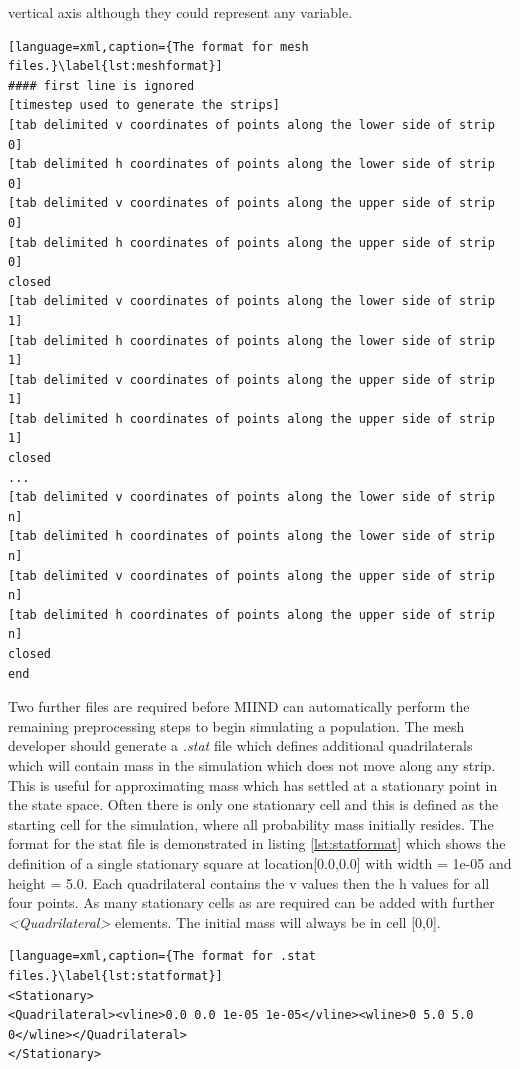 \documentclass[utf8]{frontiers_suppmat} %
\begin{document}
vertical axis although they could represent any variable.

\begin{lstlisting}[language=xml,caption={The format for mesh files.}\label{lst:meshformat}]
#### first line is ignored
[timestep used to generate the strips]
[tab delimited v coordinates of points along the lower side of strip 0]
[tab delimited h coordinates of points along the lower side of strip 0]
[tab delimited v coordinates of points along the upper side of strip 0]
[tab delimited h coordinates of points along the upper side of strip 0]
closed
[tab delimited v coordinates of points along the lower side of strip 1]
[tab delimited h coordinates of points along the lower side of strip 1]
[tab delimited v coordinates of points along the upper side of strip 1]
[tab delimited h coordinates of points along the upper side of strip 1]
closed
...
[tab delimited v coordinates of points along the lower side of strip n]
[tab delimited h coordinates of points along the lower side of strip n]
[tab delimited v coordinates of points along the upper side of strip n]
[tab delimited h coordinates of points along the upper side of strip n]
closed
end
\end{lstlisting}

Two further files are required before MIIND can automatically perform the remaining preprocessing steps to begin simulating a population. The mesh developer should generate a \textit{.stat} file which defines additional quadrilaterals which will contain mass in the simulation which does not move along any strip. This is useful for approximating mass which has settled at a stationary point in the state space. Often there is only one stationary cell and this is defined as the starting cell for the simulation, where all probability mass initially resides. The format for the stat file is demonstrated in listing \ref{lst:statformat} which shows the definition of a single stationary square at location[0.0,0.0] with width = 1e-05 and height = 5.0. Each quadrilateral contains the v values then the h values for all four points. As many stationary cells as are required can be added with further \textit{\textless Quadrilateral\textgreater} elements. The initial mass will always be in cell [0,0].

\begin{lstlisting}[language=xml,caption={The format for .stat files.}\label{lst:statformat}]
<Stationary>
<Quadrilateral><vline>0.0 0.0 1e-05 1e-05</vline><wline>0 5.0 5.0 0</wline></Quadrilateral>
</Stationary>
\end{lstlisting}
\end{document}
